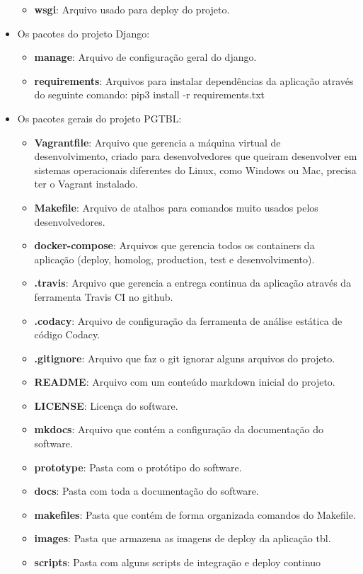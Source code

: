 \begin{itemize}
\begin{itemize}
    \item \textbf{wsgi}: Arquivo usado para deploy do projeto.
  \end{itemize}
  \item Os pacotes do projeto Django:
  \begin{itemize}
    \item \textbf{manage}: Arquivo de configuração geral do django.
    \item \textbf{requirements}: Arquivos para instalar dependências da aplicação através do seguinte comando:
      pip3 install -r requirements.txt
  \end{itemize}
  \item Os pacotes gerais do projeto PGTBL:
  \begin{itemize}
    \item \textbf{Vagrantfile}: Arquivo que gerencia a máquina virtual de desenvolvimento, criado para desenvolvedores
      que queiram desenvolver em sistemas operacionais diferentes do Linux, como Windows ou Mac, precisa ter o
      Vagrant instalado.
    \item \textbf{Makefile}: Arquivo de atalhos para comandos muito usados pelos desenvolvedores.
    \item \textbf{docker-compose}: Arquivos que gerencia todos os containers da aplicação
      (deploy, homolog, production, test e desenvolvimento).
    \item \textbf{.travis}: Arquivo que gerencia a entrega continua da aplicação através da ferramenta Travis CI no github.
    \item \textbf{.codacy}: Arquivo de configuração da ferramenta de análise estática de código Codacy.
    \item \textbf{.gitignore}: Arquivo que faz o git ignorar alguns arquivos do projeto.
    \item \textbf{README}: Arquivo com um conteúdo markdown inicial do projeto.
    \item \textbf{LICENSE}: Licença do software.
    \item \textbf{mkdocs}: Arquivo que contém a configuração da documentação do software.
    \item \textbf{prototype}: Pasta com o protótipo do software.
    \item \textbf{docs}: Pasta com toda a documentação do software.
    \item \textbf{makefiles}: Pasta que contém de forma organizada comandos do Makefile.
    \item \textbf{images}: Pasta que armazena as imagens de deploy da aplicação tbl.
    \item \textbf{scripts}: Pasta com alguns scripts de integração e deploy continuo
  \end{itemize}
\end{itemize}
